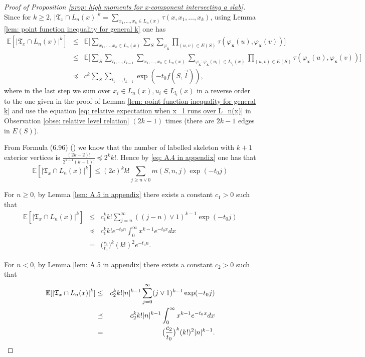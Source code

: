 \documentclass[12pt]{article}
\numberwithin{equation}{section}
\newcommand{\1}{\mathbf{1}}
\begin{document}
\begin{proof}[Proof of Proposition \ref{prop: high moments for x-component intersecting a slab}]
	Since for $k\geq2$, $|\mathfrak{T}_x\cap L_n(x)|^k=\sum_{x_1,\ldots,x_k\in L_n(x)}{\tau(x,x_1,\ldots,x_k)}$, using Lemma \ref{lem: point function inequality for general k} one has 
	\begin{eqnarray}\label{eq: A.4 in appendix}
	\mathbb{E}[|\mathfrak{T}_x\cap L_n(x)|^k]&\leq&\mathbb{E}\bigg[
	\sum_{x_1,\ldots,x_k\in L_n(x)}\sum_{S}\sum_{\varphi_{\mathbf{x}}} \prod_{(u,v)\in E(S)}\tau(\varphi_{\mathbf{x}}(u),\varphi_{\mathbf{x}}(v))\bigg]\nonumber\\
	&\leq& \mathbb{E}\bigg[\sum_{S}\sum_{l_1,\ldots,l_{k-1}}
	\sum_{x_1,\ldots,x_k\in L_n(x)}\sum_{\varphi_{\mathbf{x}}:\varphi_{\mathbf{x}}(u_i)\in L_{l_i}(x)} \prod_{(u,v)\in E(S)}\tau(\varphi_{\mathbf{x}}(u),\varphi_{\mathbf{x}}(v))\bigg]\nonumber\\
	&\preceq& c^k\sum_{S}\sum_{l_1,\ldots,l_{k-1}}\exp(-t_0f(S,\vec{l})),
	\end{eqnarray}
	where in the last step we sum over  $x_i\in L_n(x),u_i\in L_{l_i}(x)$ in a reverse order to the one given in the proof of Lemma \ref{lem: point function inequality for general k} and use the equation \eqref{eq: relative expectation when x_1 runs over L_n(x)} in  Observation \ref{obse: relative level relation} $(2k-1)$ times (there are $2k-1$ edges in $E(S)$).
	
From Formula (6.96) (\cite[Page 138, Section 6.3]{Grimmett1999}) we know that the number of labelled skeleton with $k+1$ exterior vertices is $\frac{(2k-2)!}{2^{k-1}(k-1)!}\preceq 2^kk!$. 
Hence by \eqref{eq: A.4 in appendix}  one has that 
\begin{equation}\label{eq: A.5 in appendix}
\mathbb{E}[|\mathfrak{T}_x\cap L_n(x)|^k]\leq
(2c)^kk!\sum_{j\geq n\vee 0}{m(S,n,j)\exp(-t_0j)}
\end{equation}

For $n\geq0$, by Lemma \ref{lem: A.5 in appendix}  there exists a constant $c_1>0$ such that 
\begin{eqnarray*}
\mathbb{E}[|\mathfrak{T}_x\cap L_n(x)|^k]&\leq& c_1^kk! \sum_{j=n}^{\infty}((j-n)\vee 1)^{k-1}\exp(-t_0j)\nonumber\\
&\preceq &c_1^kk!  e^{-t_0n}\int_{0}^{\infty}x^{k-1}e^{-t_0x}dx\nonumber\\
&=&\big(\frac{c_1}{t_0}\big)^k(k!)^2e^{-t_0n}.
\end{eqnarray*}

For $n<0$, by Lemma \ref{lem: A.5 in appendix}  there exists a constant $c_2>0$ such that 
\begin{eqnarray*}
	\mathbb{E}[|\mathfrak{T}_x\cap L_n(x)|^k]&\leq& c_2^kk!|n|^{k-1} \sum_{j=0}^{\infty}(j\vee1)^{k-1}\exp(-t_0j)\nonumber\\
	&\preceq &c_2^kk!|n|^{k-1}\int_{0}^{\infty}x^{k-1}e^{-t_0x}dx\nonumber\\
	&=&\big(\frac{c_2}{t_0}\big)^k(k!)^2|n|^{k-1}.\qedhere
\end{eqnarray*}
\end{proof}
\end{document}
